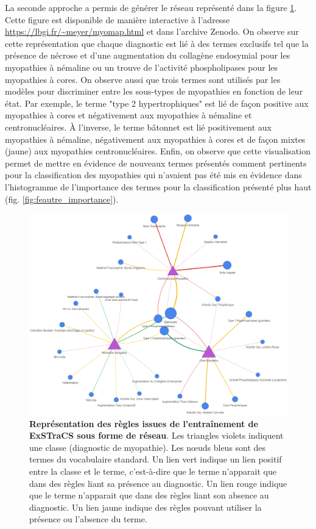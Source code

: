 La seconde approche a permis de générer le réseau représenté dans la figure \ref{fig:network}. Cette figure est disponible de manière interactive à l'adresse \url{https://lbgi.fr/~meyer/myomap.html}  et dans l'archive Zenodo. On observe sur cette représentation que chaque diagnostic est lié à des  termes exclusifs tel que la présence de nécrose et d'une augmentation du collagène endosymial pour les myopathies à némaline ou un trouve de l'activité phospholipases pour les myopathies à cores. On observe aussi que trois termes sont utilisés par les modèles pour discriminer entre les sous-types de myopathies en fonction de leur état. Par exemple, le terme "type 2 hypertrophiques" est lié de façon positive aux myopathies à cores et négativement aux myopathies à némaline et centronucléaires. À l'inverse, le terme bâtonnet est lié positivement aux myopathies à némaline, négativement aux myopathies à cores et de façon mixtes (jaune) aux myopathies centronucléaires. Enfin, on observe que cette visualisation permet de mettre en évidence de nouveaux termes présentés comment pertinents pour la classification des myopathies qui n'avaient pas été mis en évidence dans l'histogramme de l'importance des termes pour la classification présenté plus haut (fig. \ref{fig:feautre_importance}).
\begin{figure}[H]
  \centering
  \includegraphics[width=1\textwidth]{figures/network_lcs.png}
  \caption[Représentation des règles issues de l'entraînement de ExSTraCS sous forme de réseau]{\textbf{Représentation des règles issues de l'entraînement de ExSTraCS sous forme de réseau}. Les triangles violets indiquent une classe (diagnostic de myopathie). Les nœuds bleus sont des termes du vocabulaire standard. Un lien vert indique un lien positif entre la classe et le terme, c'est-à-dire que le terme n'apparait que dans des règles liant sa présence au diagnostic. Un lien rouge indique que le terme n'apparait que dans des règles liant son absence au diagnostic. Un lien jaune indique des règles pouvant utiliser la présence ou l'absence du terme.}
  \label{fig:network}
\end{figure}
